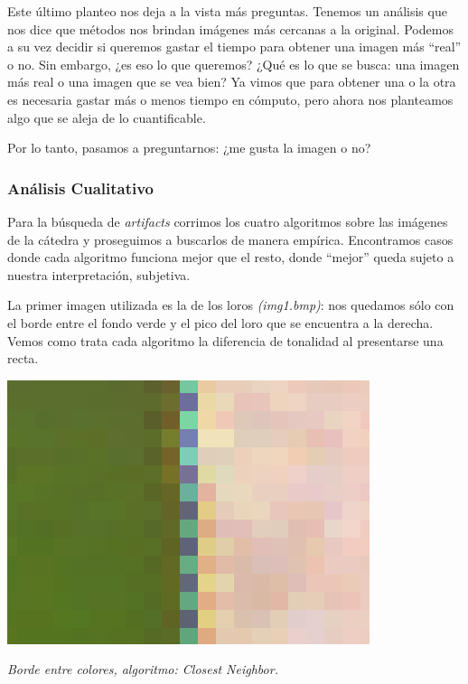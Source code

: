 \begin{itemize}
\vspace{\baselineskip}

Este último planteo nos deja a la vista más preguntas. Tenemos un análisis que nos dice que métodos nos brindan imágenes más cercanas a la original. Podemos a su vez decidir si queremos gastar el tiempo para obtener una imagen más ``real'' o no. Sin embargo, ¿es eso lo que queremos? ¿Qué es lo que se busca: una imagen más real o una imagen que se vea bien? Ya vimos que para obtener una o la otra es necesaria gastar más o menos tiempo en cómputo, pero ahora nos planteamos algo que se aleja de lo cuantificable. 

\vspace{\baselineskip}

Por lo tanto, pasamos a preguntarnos: ¿me gusta la imagen o no?

\end{itemize}

\subsubsection{Análisis Cualitativo}

Para la búsqueda de \textit{artifacts} corrimos los cuatro algoritmos sobre las imágenes de la cátedra y proseguimos a buscarlos de manera empírica. Encontramos casos donde cada algoritmo funciona mejor que el resto, donde ``mejor'' queda sujeto a nuestra interpretación, subjetiva.

\vspace{\baselineskip}

La primer imagen utilizada es la de los loros \textit{(img1.bmp)}: nos quedamos sólo con el borde entre el fondo verde y el pico del loro que se encuentra a la derecha. Vemos como trata cada algoritmo la diferencia de tonalidad al presentarse una recta. 

\vspace{\baselineskip}

	\begin{center}
		\includegraphics[scale=.5]{../enunciado/images_files/cualitativo/pico_loro_closest.png}
		\vspace{2pt}
		\par
		\footnotesize\textit{Borde entre colores, algoritmo: Closest Neighbor.}
	\end{center}

